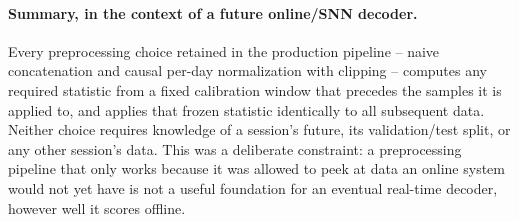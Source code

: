 \paragraph{Summary, in the context of a future online/SNN decoder.} Every
preprocessing choice retained in the production pipeline -- naive
concatenation and causal per-day normalization with clipping -- computes any
required statistic from a fixed calibration window that precedes the samples
it is applied to, and applies that frozen statistic identically to all
subsequent data. Neither choice requires knowledge of a session's future,
its validation/test split, or any other session's data. This was a
deliberate constraint: a preprocessing pipeline that only works because it
was allowed to peek at data an online system would not yet have is not a
useful foundation for an eventual real-time decoder, however well it scores
offline.
